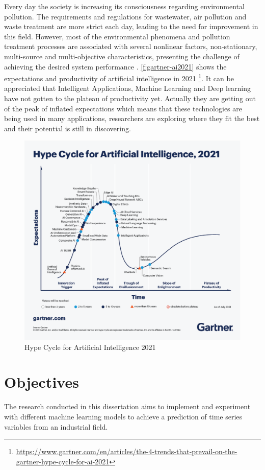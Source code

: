 Every day the society is increasing its consciousness regarding environmental pollution. The  requirements and regulations for wastewater, air pollution and waste treatment are more strict each day, leading to the need for improvement in this field. However, most of the environmental phenomena and pollution treatment processes are associated with several nonlinear factors, non-stationary, multi-source and multi-objective characteristics, presenting the challenge of achieving the desired system performance \cite{Ye2020}. \autoref{f:gartner-ai2021} shows the expectations and productivity of artificial intelligence in 2021 \footnote{\url{https://www.gartner.com/en/articles/the-4-trends-that-prevail-on-the-gartner-hype-cycle-for-ai-2021}}. It can be appreciated that Intelligent Applications, Machine Learning and Deep learning have not gotten to the plateau of productivity yet. Actually they are getting out of the peak of inflated expectations which means that these technologies are being used in many applications, researchers are exploring where they fit the best and their potential is still in discovering. 

\begin{figure}[t]
\centering
\includegraphics[width=\linewidth]{figures/Ch1/gartner-ai2021.pdf}
\caption{Hype Cycle for Artificial Intelligence 2021}
\label{f:gartner-ai2021}
\end{figure}

\section{Objectives}
\label{s:Objectives}
The research conducted in this dissertation aims to implement and experiment with different machine learning models to achieve a prediction of time series variables from an industrial field.


